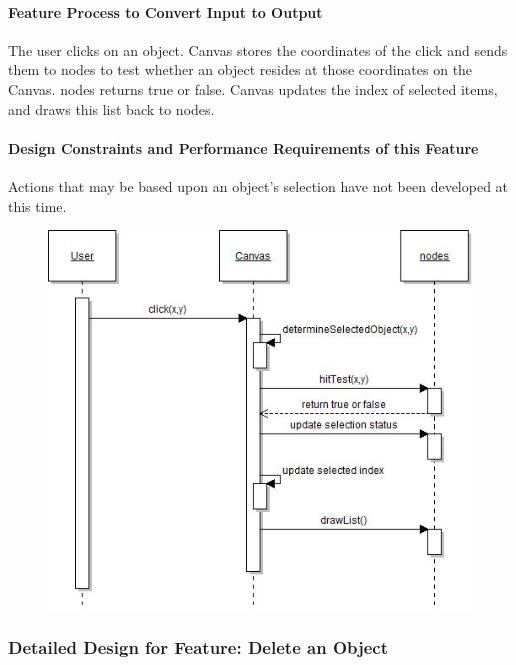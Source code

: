 \documentclass[twoside,letterpaper]{article}
\begin{document}
{\paragraph{Feature Process to Convert Input to Output}
{\color{black}
The user clicks on an object. Canvas stores the coordinates of the click and sends them to nodes to test whether an object resides at those coordinates on the Canvas.  nodes returns true or false. Canvas updates the index of selected items, and draws this list back to nodes.
}

\paragraph{Design Constraints and Performance Requirements of this Feature}
{\color{black}
Actions that may be based upon an object{\textquoteright}s selection have not been developed at this time.
}
\bigskip
\bigskip

\begin{figure}[h]
\centering
\includegraphics[width=5.0in]{IntSelectObj.jpg}
\end{figure}

\clearpage



 

\subsubsection{Detailed Design for Feature: Delete an Object}

}
\end{document}
